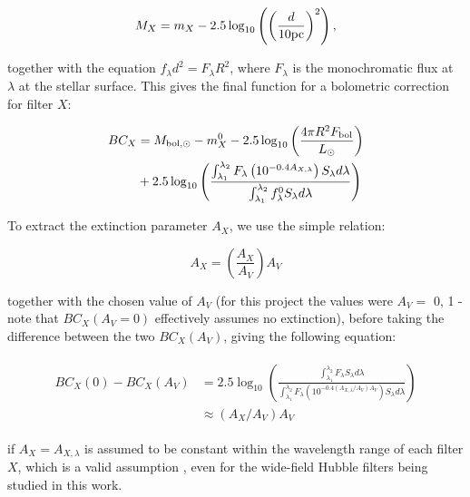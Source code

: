 \documentclass[12pt, a4paper]{report}
\begin{document}
\begin{equation}
M_{X} = m_{X} - 2.5 \log_{10}\left( \left( \frac{d}{10 \textnormal{pc}} \right)^{2} \right),
\label{abs_mag_def}
\end{equation}

together with the equation $f_{\lambda}d^{2}=F_{\lambda}R^{2}$, where $F_{\lambda}$ is the monochromatic flux at $\lambda$ at the stellar surface. This gives the final function for a bolometric correction for filter $X$:

\begin{align}
\begin{split}
BC_{X} &= M_{\textnormal{bol},\odot} - m_{X}^{0} - 2.5 \log_{10} \left( \frac{4\pi R^{2}F_{\textnormal{bol}}}{L_{\odot}} \right) \\
&+ 2.5 \log_{10} \left( \frac{\int_{\lambda_{1}}^{\lambda_{2}} F_{\lambda} \left( 10^{-0.4 A_{X,\lambda}} \right) S_{\lambda} d\lambda}{\int_{\lambda_{1}}^{\lambda_{2}} f_{\lambda}^{0} S_{\lambda} d\lambda} \right)
\label{BC_extinc}
\end{split}
\end{align}

To extract the extinction parameter $A_{X}$, we use the simple relation:

\begin{equation}
A_{X} = \left( \frac{A_{X}}{A_{V}} \right) A_{V}
\label{ratio_eq}
\end{equation}

together with the chosen value of $A_{V}$ (for this project the values were $A_{V} =$ 0, 1 - note that $BC_{X}(A_{V}=0)$  effectively assumes no extinction), before taking the difference between the two $BC_{X}(A_{V})$, giving the following equation:

\begin{align}
\begin{split}
BC_{X}(0) - BC_{X}(A_{V}) &= 2.5 \log_{10} \left( \frac{\int_{\lambda_{1}}^{\lambda_{2}} F_{\lambda}  S_{\lambda} d\lambda}{\int_{\lambda_{1}}^{\lambda_{2}} F_{\lambda}\left( 10^{-0.4 \left(A_{X,\lambda}/A_{V}\right)A_{V}} \right) S_{\lambda} d\lambda} \right)
\\ &\approx \left(A_{X}/A_{V}\right)A_{V}
\label{BCs_diff}
\end{split}
\end{align}

if $A_{X} = A_{X,\lambda}$ is assumed to be constant within the wavelength range of each filter $X$, which is a valid assumption \citep{2008PASP..120..583G}, even for the wide-field Hubble filters being studied in this work.
\end{document}
